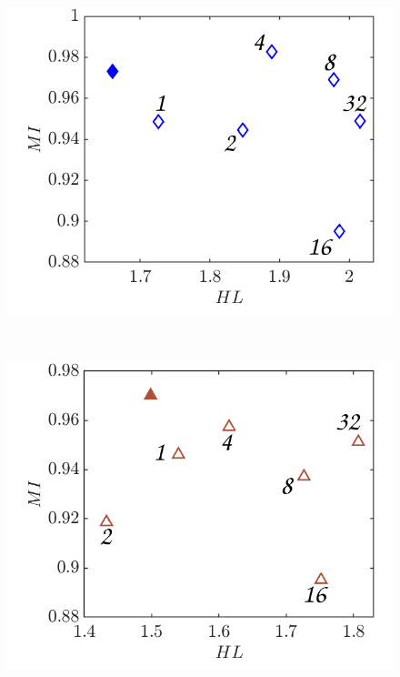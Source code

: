 \documentclass[%
aip,
amsmath,amssymb,
reprint,
]{revtex4-1}
\begin{document}
\begin{figure}
\begin{center}
					\begin{minipage}[c]{0.3\linewidth}
						\includegraphics[width=1\linewidth,trim=0.5cm 0cm 0cm 0cm,clip]{Figures/MI_8h_HL_3.png}
					\end{minipage}\\
					\begin{minipage}[c]{0.3\linewidth}
						\includegraphics[width=1\linewidth,trim=0.5cm 0cm 0cm 0cm,clip]{Figures/MI_8h_HL_4.png}
					\end{minipage}
					\begin{minipage}[c]{0.3\linewidth}

\end{minipage}
\end{center}
\end{figure}
\end{document}
